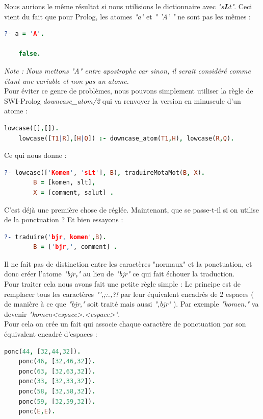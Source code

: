 \documentclass[11pt]{report}
\begin{document}
	Nous aurions le même résultat si nous utilisions le dictionnaire avec {\em "s\textbf{L}t"}. Ceci vient du fait que pour Prolog, les atomes {\em "a"} et {\em " 'A' "} ne sont pas les mêmes :
	\begin{lstlisting}[language=Prolog]
	?- a = 'A'.
	
	false.
	\end{lstlisting}
	
	{\em Note : Nous mettons "A" entre apostrophe car sinon, il serait considéré comme étant une variable et non pas un atome.}\\
	
	Pour éviter ce genre de problèmes, nous pouvons simplement utiliser la règle de SWI-Prolog {\em downcase\_atom/2} qui va renvoyer la version en minuscule d'un atome :
	\begin{lstlisting}[language=Prolog]
	lowcase([],[]).
	lowcase([T1|R],[H|Q]) :- downcase_atom(T1,H), lowcase(R,Q).
	\end{lstlisting}
	
	Ce qui nous donne :
	\begin{lstlisting}[language=Prolog]
	?- lowcase(['Komen', 'sLt'], B), traduireMotaMot(B, X).
		B = [komen, slt],
		X = [comment, salut] .
	\end{lstlisting}
	
	C'est déjà une première chose de réglée. Maintenant, que se passe-t-il si on utilise de la ponctuation ? Et bien essayons :
	\begin{lstlisting}[language=Prolog]
	?- traduire('bjr, komen',B).
		B = ['bjr,', comment] .
	\end{lstlisting}
	
	Il ne fait pas de distinction entre les caractères "normaux" et la ponctuation, et donc créer l'atome {\em "bjr\textbf{,}"} au lieu de {\em "bjr"} ce qui fait échouer la traduction.\\
	Pour traiter cela nous avons fait une petite règle simple : Le principe est de remplacer tous les caractères {\em "',;:.,?!} par leur équivalent encadrés de 2 espaces ( de manière à ce que {\em "bjr,"} soit traité mais aussi {\em ",bjr"} ). Par exemple {\em "komen."} va devenir {\em "komen<espace>.<espace>"}.\\
	Pour cela on crée un fait qui associe chaque caractère de ponctuation par son équivalent encadré d'espaces :
	\begin{lstlisting}[language=Prolog]
	ponc(44, [32,44,32]).
	ponc(46, [32,46,32]).
	ponc(63, [32,63,32]).
	ponc(33, [32,33,32]).
	ponc(58, [32,58,32]).
	ponc(59, [32,59,32]).
	ponc(E,E).
	\end{lstlisting}
	
\end{document}
